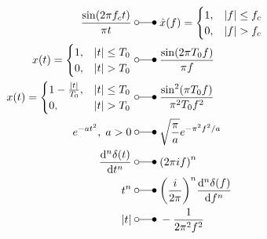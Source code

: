 \begin{align*}
    \frac{\sin(2\pi f_c t)}{\pi t} \;                                         & \laplace\;  \hat{x}(f) =\begin{cases}1,&|f|\leq f_c\\0,&|f|>f_c\end{cases}             \\
    x(t)=\begin{cases}1,&|t|\le T_0\\0,&|t|>T_0\end{cases} \;                 & \laplace\;  \frac{\sin(2\pi T_0f)}{\pi f}                                              \\
    x(t)=\begin{cases}1-\frac{|t|}{T_0},&|t|\le T_0\\0,&|t|>T_0\end{cases} \; & \laplace\;  \frac{\sin^2(\pi T_0f)}{\pi^2T_0f^2}                                       \\
    e^{-at^{2}},\; a>0 \;                                                     & \laplace\;  \sqrt{\frac{\pi}{a}}e^{-\pi^2f^2/a}                                        \\
    \frac{\mathrm{d}^n\delta(t)}{\mathrm{d}t^n} \;                            & \laplace\;  {(2\pi if)}^n                                                              \\
    t^{n} \;                                                                  & \laplace\;  {\left(\frac{i}{2\pi}\right)}^n\frac{\mathrm{d}^n\delta(f)}{\mathrm{d}f^n} \\
    |t| \;                                                                    & \laplace\;  -\frac1{2\pi^2f^2}
\end{align*}
